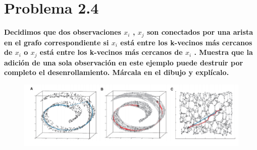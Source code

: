\section*{Problema 2.4}

\textbf{Decidimos que dos observaciones $x_i$ , $x_j$ son conectados por una arista en el grafo correspondiente si $x_i$ está entre los k-vecinos más cercanos de $x_i$ o $x_j$ está entre los k-vecinos más cercanos de $x_i$ . Muestra que la adición de una sola observación en este ejemplo puede destruir por completo el desenrollamiento. Márcala en el dibujo y explícalo.}

\begin{figure}[H]
    \centering
    \includegraphics[width=13cm]{Graphics/Problema_2_4.png}
    \caption{}
\end{figure}